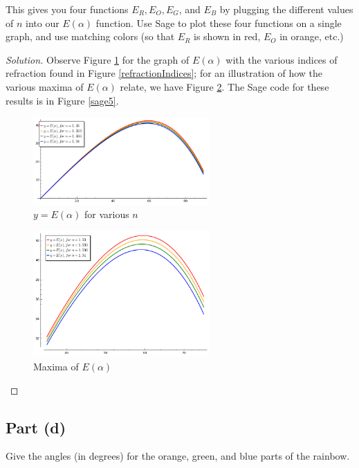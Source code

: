 \documentclass[letterpaper, 12pt]{amsart}
\theoremstyle{definition}  %
\begin{document}
		This gives you four functions $E_{R}, E_{O}, E_{G}$, and $E_{B}$ by plugging the different values of $n$ into our $E(\alpha)$ function. 
		Use Sage to plot these four functions on a single graph, and use matching colors (so that $E_{R}$ is shown in red, $E_{O}$ in orange, etc.)

		\begin{proof}[Solution]
		Observe Figure \ref{rainbowGraph} for the graph of $E(\alpha)$ with the various indices of refraction found in Figure \ref{refractionIndices}; for an illustration of how the various maxima of $E(\alpha)$ relate, we have Figure \ref{raibowZoom}.
		The Sage code for these results is in Figure \ref{sage5}.

			\begin{figure}[h]
				\includegraphics[width=0.6\textwidth]{figs/e.png}
				\caption{$y = E(\alpha)$ for various $n$}
				\label{rainbowGraph}
			\end{figure}

			\begin{figure}[h]
				\includegraphics[width=0.6\textwidth]{figs/f.png}
				\caption{Maxima of $E(\alpha)$}
				\label{raibowZoom}
			\end{figure}
		\end{proof}

		\subsection*{Part (d)}
		Give the angles (in degrees) for the orange, green, and blue parts of the rainbow.
\end{document}

